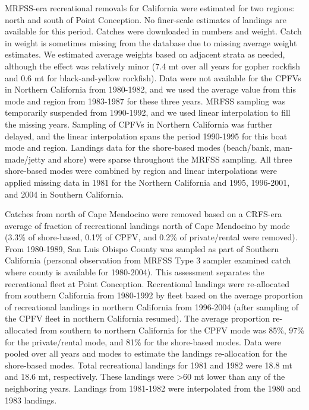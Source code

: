 \documentclass[12pt,]{article}
\begin{document}
MRFSS-era recreational removals for California were estimated for two
regions: north and south of Point Conception. No finer-scale estimates
of landings are available for this period. Catches were downloaded in
numbers and weight. Catch in weight is sometimes missing from the
database due to missing average weight estimates. We estimated average
weights based on adjacent strata as needed, although the effect was
relatively minor (7.4 mt over all years for gopher rockfish and 0.6 mt
for black-and-yellow rockfish). Data were not available for the CPFVs in
Northern California from 1980-1982, and we used the average value from
this mode and region from 1983-1987 for these three years. MRFSS
sampling was temporarily suspended from 1990-1992, and we used linear
interpolation to fill the missing years. Sampling of CPFVs in Northern
California was further delayed, and the linear interpolation spans the
period 1990-1995 for this boat mode and region. Landings data for the
shore-based modes (beach/bank, man-made/jetty and shore) were sparse
throughout the MRFSS sampling. All three shore-based modes were combined
by region and linear interpolations were applied missing data in 1981
for the Northern California and 1995, 1996-2001, and 2004 in Southern
California.

Catches from north of Cape Mendocino were removed based on a CRFS-era
average of fraction of recreational landings north of Cape Mendocino by
mode (3.3\% of shore-based, 0.1\% of CPFV, and 0.2\% of private/rental
were removed). From 1980-1989, San Luis Obispo County was sampled as
part of Southern California (personal observation from MRFSS Type 3
sampler examined catch where county is available for 1980-2004). This
assessment separates the recreational fleet at Point Conception.
Recreational landings were re-allocated from southern California from
1980-1992 by fleet based on the average proportion of recreational
landings in northern California from 1996-2004 (after sampling of the
CPFV fleet in northern California resumed). The average proportion
re-allocated from southern to northern California for the CPFV mode was
85\%, 97\% for the private/rental mode, and 81\% for the shore-based
modes. Data were pooled over all years and modes to estimate the
landings re-allocation for the shore-based modes. Total recreational
landings for 1981 and 1982 were 18.8 mt and 18.6 mt, respectively. These
landings were \textgreater{}60 mt lower than any of the neighboring
years. Landings from 1981-1982 were interpolated from the 1980 and 1983
landings.
\end{document}
